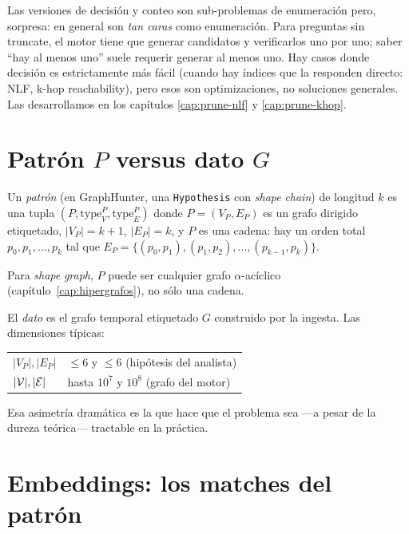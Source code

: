 \begin{nota}
Las versiones de decisión y conteo son sub-problemas de enumeración
pero, sorpresa: en general son \emph{tan caras} como enumeración.
Para preguntas sin truncate, el motor tiene que generar candidatos y
verificarlos uno por uno; saber ``hay al menos uno'' suele requerir
generar al menos uno. Hay casos donde decisión es estrictamente más
fácil (cuando hay índices que la responden directo: NLF, k-hop
reachability), pero esos son optimizaciones, no soluciones generales.
Las desarrollamos en los capítulos \ref{cap:prune-nlf} y
\ref{cap:prune-khop}.
\end{nota}

\section{Patrón \(P\) versus dato \(G\)}

\begin{definition}[Patrón]
Un \emph{patrón} (en GraphHunter, una \texttt{Hypothesis} con
\emph{shape} \emph{chain}) de longitud \(k\) es una tupla
\((P, \mathrm{type}_V^P, \mathrm{type}_E^P)\) donde \(P =
(V_P, E_P)\) es un grafo dirigido etiquetado, \(|V_P| = k+1\),
\(|E_P| = k\), y \(P\) es una cadena: hay un orden total
\(p_0, p_1, \dots, p_k\) tal que \(E_P = \{(p_0, p_1), (p_1, p_2),
\dots, (p_{k-1}, p_k)\}\).

Para \emph{shape} \emph{graph}, \(P\) puede ser cualquier grafo
\(\alpha\)-acíclico (capítulo~\ref{cap:hipergrafos}), no sólo una
cadena.
\end{definition}

El \emph{dato} es el grafo temporal etiquetado \(G\) construido por
la ingesta. Las dimensiones típicas:

\begin{center}
\renewcommand{\arraystretch}{1.2}
\begin{tabular}{ll}
\toprule
\(|V_P|, |E_P|\) & \(\leq 6\) y \(\leq 6\) (hipótesis del analista) \\
\(|\mathcal{V}|, |\mathcal{E}|\) & hasta \(10^7\) y \(10^8\) (grafo del motor) \\
\bottomrule
\end{tabular}
\end{center}

Esa asimetría dramática es la que hace que el problema sea ---a pesar
de la dureza teórica--- tractable en la práctica.

\section{Embeddings: los matches del patrón}

